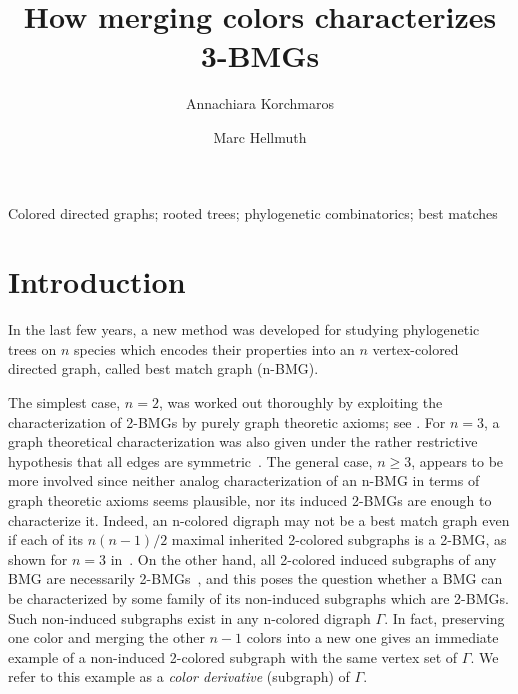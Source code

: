 \documentclass[final,3p,times]{elsarticle}
\begin{document}
\begin{frontmatter}
  \title{How merging colors characterizes 3-BMGs}

  \author[LEI]{Annachiara Korchmaros}

  \author[STOCK]{Marc Hellmuth}

\address[LEI]{Bioinformatics Group, Department of Computer Science \&
  Interdisciplinary Center for Bioinformatics, Universit{\"a}t Leipzig,
  H{\"a}rtelstra{\ss}e 16-18, D-04107 Leipzig, Germany}

\address[STOCK]{Department of Mathematics, Faculty of Science,
Stockholm University, SE-10691 Stockholm, Sweden}


\begin{abstract}
  
\end{abstract}


\begin{keyword}
 Colored directed graphs; rooted trees; phylogenetic
  combinatorics; best matches
\end{keyword}

\end{frontmatter}

\sloppy

\section{Introduction}
In the last few years, a new method was developed for studying phylogenetic trees on $n$ species which encodes their properties into an $n$ vertex-colored directed graph, called best match graph (n-BMG).

The simplest case, $n=2$, was worked out thoroughly by exploiting the characterization of 2-BMGs by purely graph theoretic axioms; see \cite{Geiss:19a,Geiss:20b,Korchmaros:21a,korchmaros2021quasi,Schaller:21a,Schaller:21b,Schaller:21c,Schaller:21d}. For $n=3$, a graph theoretical characterization was also given under the rather restrictive hypothesis that all edges are symmetric~\cite{geiss2020reciprocal}. The general case, $n\ge 3$, appears to be more involved since neither analog characterization of an n-BMG in terms of graph theoretic axioms seems plausible, nor its induced 2-BMGs are enough to characterize it. Indeed, an n-colored digraph may not be a best match graph even if each of its $n(n-1)/2$ maximal inherited 2-colored subgraphs is a 2-BMG, as shown for $n=3$ in~\cite[Figure 1]{schaller2021corrigendum}. On the other hand, all 2-colored induced subgraphs of any BMG are necessarily 2-BMGs~\cite[Corollary 5]{Geiss:19a}, and this poses the question whether a BMG can be characterized by some family of its non-induced subgraphs which are 2-BMGs. Such non-induced subgraphs exist in any n-colored digraph $\Gamma$. In fact, preserving one color and merging the other $n-1$ colors into a new one gives an immediate example of a non-induced 2-colored subgraph with the same vertex set of $\Gamma$. We refer to this example as a \emph{color derivative} (subgraph) of $\Gamma$.
\end{document}
